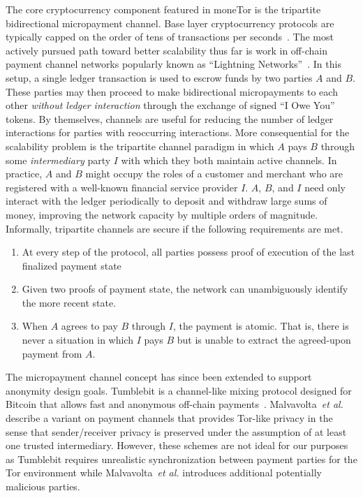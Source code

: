 The core cryptocurrency component featured in moneTor is the tripartite
bidirectional micropayment channel. Base layer cryptocurrency protocols are
typically capped on the order of tens of transactions per
seconds~\cite{team2018blockchain}. The most actively pursued path toward better
scalability thus far is work in off-chain payment channel networks popularly
known as ``Lightning Networks''~\cite{poon2016bitcoin}. In this setup, a single
ledger transaction is used to escrow funds by two parties $A$ and $B$. These
parties may then proceed to make bidirectional micropayments to each other
\emph{without ledger interaction} through the exchange of signed ``I Owe You''
tokens. By themselves, channels are useful for reducing the number of ledger
interactions for parties with reoccurring interactions. More consequential for
the scalability problem is the tripartite channel paradigm in which $A$ pays $B$
through some \emph{intermediary} party $I$ with which they both maintain active
channels. In practice, $A$ and $B$ might occupy the roles of a customer and
merchant who are registered with a well-known financial service provider $I$.
$A$, $B$, and $I$ need only interact with the ledger periodically to deposit and
withdraw large sums of money, improving the network capacity by multiple orders
of magnitude. Informally, tripartite channels are secure if the following
requirements are met.

\begin{enumerate}
\item At every step of the protocol, all parties possess proof of execution of
  the last finalized payment state
\item Given two proofs of payment state, the network can unambiguously identify
  the more recent state.
\item When $A$ agrees to pay $B$ through $I$, the payment is atomic. That is,
  there is never a situation in which $I$ pays $B$ but is unable to extract the
  agreed-upon payment from $A$.
\end{enumerate}


 The micropayment channel concept has since been extended to support anonymity
 design goals. Tumblebit is a channel-like mixing protocol designed for Bitcoin
 that allows fast and anonymous off-chain payments~\cite{heilman2017tumblebit}.
 Malvavolta~\textit{et al.}~\cite{malavolta2017concurrency} describe a variant on
 payment channels that provides Tor-like privacy in the sense that
 sender/receiver privacy is preserved under the assumption of at least one
 trusted intermediary. However, these schemes are not ideal for our purposes as
 Tumblebit requires unrealistic synchronization between payment parties for the
 Tor environment while Malvavolta~\textit{et al.} introduces additional
 potentially malicious parties.


